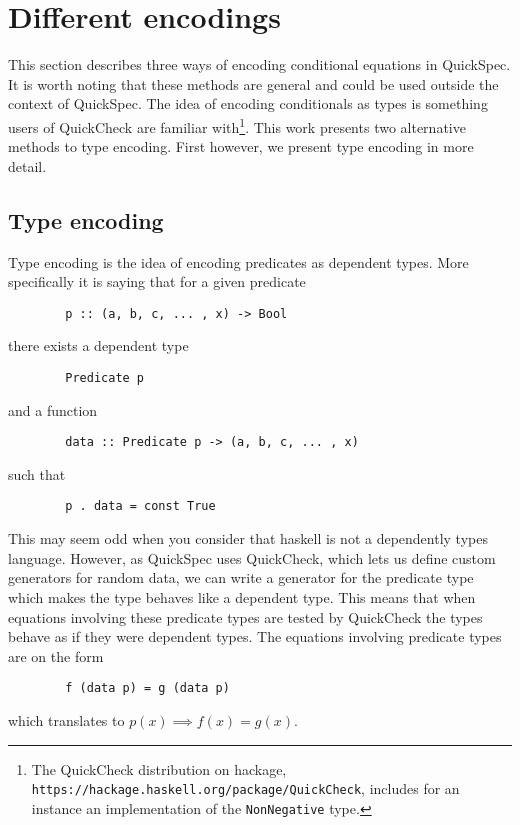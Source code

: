 \section{Different encodings}\label{encodings}

    This section describes three
    ways of encoding conditional
    equations in QuickSpec. It is
    worth noting that these methods
    are general and could be used outside
    the context of QuickSpec. The
    idea of encoding conditionals
    as types is something users of
    QuickCheck\cite{Claessen2000}
    are familiar with\footnote{The QuickCheck distribution
    on hackage, \texttt{https://hackage.haskell.org/package/QuickCheck}, includes for an instance an implementation
    of the \texttt{NonNegative} type.}. 
    This work presents two alternative methods
    to type encoding. First however, we present type encoding
    in more detail.

    \subsection{Type encoding}\label{TE}

        Type encoding is the idea of encoding
        predicates as dependent types. More specifically
        it is saying that for a given predicate
        \begin{verbatim}
        p :: (a, b, c, ... , x) -> Bool
        \end{verbatim}
        there exists a dependent type
        \begin{verbatim}
        Predicate p
        \end{verbatim}
        and a function 
        \begin{verbatim}
        data :: Predicate p -> (a, b, c, ... , x)
        \end{verbatim}
        such that 
        \begin{verbatim}
        p . data = const True
        \end{verbatim}
        This may seem odd when you consider that haskell is not a dependently types
        language. However, as QuickSpec uses QuickCheck, which lets us define
        custom generators for random data, we can write a generator for 
        the predicate type which makes the type behaves like a dependent type.
        This means that when equations involving these predicate
        types are tested by QuickCheck the types behave as if they were dependent types.
        The equations involving predicate types are on the form
        \begin{verbatim}
        f (data p) = g (data p)
        \end{verbatim}
        which translates to $p(x) \implies f(x) = g(x)$.

